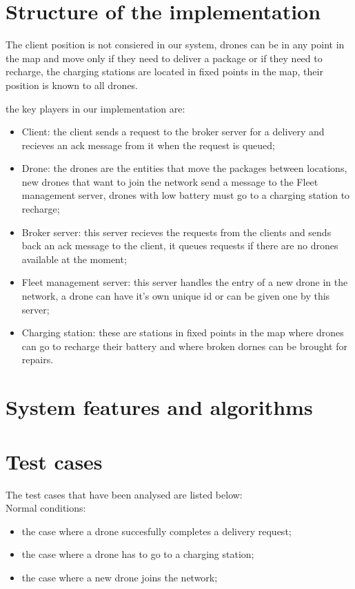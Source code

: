 \documentclass[a4paper, oneside]{memoir}
\begin{document}
\section{Structure of the implementation}

The client position is not consiered in our system, drones can be in any point in the map and move only if they need to deliver a package or if they need to recharge, the charging stations are located in fixed points in the map, their position is known to all drones.

the key players in our implementation are:
\begin{itemize}
\item Client: the client sends a request to the broker server for a delivery and recieves an ack message from it when the request is queued;
\item Drone: the drones are the entities that move the packages between locations, new drones that want to join the network send a message to the Fleet management server, drones with low battery must go to a charging station to recharge;
\item Broker server: this server recieves the requests from the clients and sends back an ack message to the client, it queues requests if there are no drones available at the moment;
\item Fleet management server: this server handles the entry of a new drone in the network, a drone can have it's own unique id or can be given one by this server;
\item Charging station: these are stations in fixed points in the map where drones can go to recharge their battery and where broken dornes can be brought for repairs.
\end{itemize}


\section{System features and algorithms}


\section{Test cases}

The test cases that have been analysed are listed below:\\

Normal conditions:
\begin{itemize}
	\item the case where a drone succesfully completes a delivery request;
	\item the case where a drone has to go to a charging station;
	\item the case where a new drone joins the network;
\end{itemize}
\end{document}
